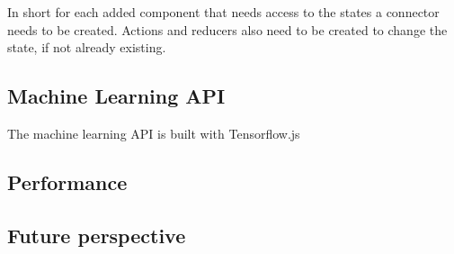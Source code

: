 In short for each added component that needs access to the states a connector needs to be created. Actions and reducers also need to be created to change the state, if not already existing.

\subsection{Machine Learning API}
The machine learning API is built with Tensorflow.js 

\subsection{Performance}

\subsection{Future perspective}




